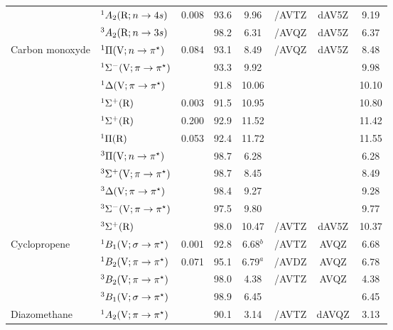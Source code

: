 \begin{tabular}{llcccccc}
                        &$^1A_2 (\mathrm{R};n \rightarrow 4s)$ 						& 0.008	&93.6& 9.96		&{\exCI}/AVTZ  & dAV5Z		&9.19 	\\
                        &$^3A_2 (\mathrm{R};n \rightarrow 3s)$ 						&		&98.2& 6.31		&{\exCI}/AVQZ & dAV5Z		&6.37	\\
      Carbon monoxyde	&$^1\Pi (\mathrm{V};n \rightarrow \pi^\star)$ 				& 0.084	&93.1 & 8.49		& {\exCI}/AVQZ& dAV5Z		&8.48	\\
                        &$^1\Sigma^- (\mathrm{V};\pi \rightarrow \pi^\star)$				&		&93.3 & 9.92		&			&			&9.98 	\\
                        &$^1\Delta (\mathrm{V};\pi \rightarrow \pi^\star)$ 				&		&91.8 &10.06		&			&			&10.10 	\\
                        &$^1\Sigma^+ (\mathrm{R})$ 								& 0.003	&91.5 &10.95		&			&			&10.80 	\\
                        &$^1\Sigma^+ (\mathrm{R})$ 								& 0.200	&92.9 &11.52		&			&			&11.42 	\\
                        &$^1\Pi (\mathrm{R})$										& 0.053	&92.4 &11.72		&			&			&11.55 	\\
                        &$^3\Pi (\mathrm{V};n \rightarrow \pi^\star)$ 					&		&98.7 & 6.28		&			&			&6.28 	\\
                        &$^3\Sigma^+ (\mathrm{V};\pi \rightarrow \pi^\star)$			&		&98.7 & 8.45		&			&			&8.49 	\\
                        &$^3\Delta (\mathrm{V};\pi \rightarrow \pi^\star)$ 				&		&98.4 & 9.27		&			&			&9.28 	\\
                        &$^3\Sigma^- (\mathrm{V};\pi \rightarrow \pi^\star)$				&		&97.5 & 9.80		&			&			&9.77	\\
                        &$^3\Sigma^+ (\mathrm{R})$ 								&		&98.0 & 10.47		&  {\exCI}/AVTZ &dAV5Z		&10.37 	\\
      Cyclopropene	&$^1B_1 (\mathrm{V};\sigma \rightarrow \pi^\star)$				& 0.001	&92.8 &6.68$^b$	& {\CCSDT}/AVTZ&AVQZ		& 6.68 	\\
                        &$^1B_2 (\mathrm{V};\pi \rightarrow \pi^\star)$				& 0.071	&95.1 &6.79$^a$	& {\exCI}/AVDZ	    &AVQZ		& 6.78 	\\
                        &$^3B_2 (\mathrm{V};\pi \rightarrow \pi^\star)$				&		&98.0 &4.38		& {\exCI}/AVTZ     &AVQZ 	& 4.38	 \\
                        &$^3B_1 (\mathrm{V};\sigma \rightarrow \pi^\star)$				& 		&98.9 &6.45		& 			    &			& 6.45 	\\
      Diazomethane	&$^1A_2 (\mathrm{V};\pi \rightarrow \pi^\star)$ 				&		&90.1 &3.14		&{\exCI}/AVTZ & dAVQZ		&3.13 	\\

\end{tabular}
